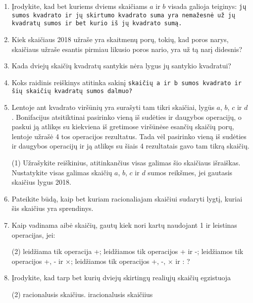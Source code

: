 \documentclass[a4paper]{article}
\begin{document}
\begin{enumerate}
\item Įrodykite, kad bet kuriems dviems skaičiams $a$ ir $b$ visada galioja teiginys: \texttt{jų sumos kvadrato ir jų skirtumo kvadrato suma yra nemažesnė už jų kvadratų sumos ir bet kurio iš jų kvadrato sumą.}

\item Kiek skaičiaus 2018 užraše yra skaitmenų porų, tokių, kad poros narys, skaičiaus užraše esantis pirmiau likusio poros nario, yra už tą narį didesnis?

\item Kada dviejų skaičių kvadratų santykis nėra lygus jų santykio kvadratui?

\item Koks raidinis reiškinys atitinka sakinį \texttt{skaičių a ir b sumos kvadrato ir šių skaičių kvadratų sumos dalmuo?}

\item  Lentoje ant kvadrato viršūnių yra surašyti tam tikri skaičiai, lygūs $a$, $b$, $c$ ir $d$. Bonifacijus atsitiktinai pasirinko vieną iš sudėties ir daugybos operacijų, o paskui ją atlikęs su kiekviena iš gretimose viršūnėse esančių skaičių porų, lentoje užrašė 4 tos operacijos rezultatus. Tada vėl pasirinko vieną iš sudėties ir daugybos operacijų ir ją atlikęs su šiais 4 rezultatais gavo tam tikrą skaičių. 
\begin{tasks}(1)
\task Užrašykite reiškinius, atitinkančius visas galimas šio skaičiaus išraiškas.
\task Nustatykite visas galimas skaičių $a$, $b$, $c$ ir $d$ sumos reikšmes, jei gautasis skaičius lygus 2018.
\end{tasks}

\item Pateikite būdą, kaip bet kuriam racionaliajam skaičiui sudaryti lygtį, kuriai šis skaičius yra sprendinys.

\item Kaip vadinama aibė skaičių, gautų kiek nori kartų naudojant 1 ir leistinas operacijas, jei:
\begin{tasks}(2)
\task leidžiama tik operacija +; 
\task leidžiamos tik operacijos + ir -; 
\task leidžiamos tik operacijos +, - ir $\times$; 
\task leidžiamos tik operacijos +, -, $\times$ ir : ? 
\end{tasks}
\item Įrodykite, kad tarp bet kurių dviejų skirtingų realiųjų skaičių egzistuoja
\begin{tasks}(2)
\task racionalusis skaičius.
\task iracionalusis skaičiius
\end{tasks}
\end{enumerate}
\end{document}
